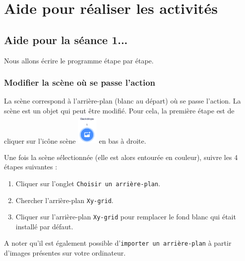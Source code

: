 \newpage





%
%
%
%



\section{Aide pour réaliser les activités}

\subsection{Aide pour la séance 1...}\label{correction_scratch1}




Nous allons écrire le programme étape par étape.


\subsubsection{Modifier la scène où se passe l'action}

La scène correspond à l'arrière-plan (blanc au départ) où se passe l'action. La scène est un objet qui peut être modifié. Pour cela, la première étape est de cliquer sur l'icône scène \includegraphics[width=1cm]{./images/scratch/changerScene} en bas à droite.


Une fois la scène sélectionnée (elle est alors entourée en couleur), suivre les 4 étapes suivantes :

\begin{enumerate}
\item Cliquer sur l'onglet \texttt{Choisir un arrière-plan}.
\item Chercher l'arrière-plan \texttt{Xy-grid}.
\item Cliquer sur l'arrière-plan \texttt{Xy-grid} pour remplacer le fond blanc qui était installé par défaut. 
\end{enumerate}

A noter qu'il est également possible d'\texttt{importer un arrière-plan} à partir d'images présentes sur votre ordinateur.

